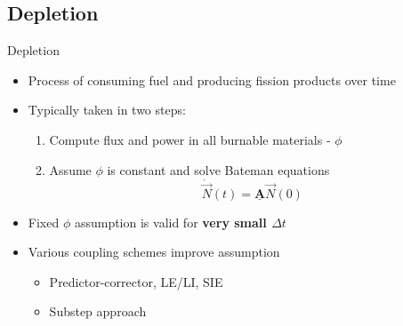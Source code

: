 \documentclass{beamer}
\begin{document}
\subsection{Depletion}
\begin{frame}{Depletion}
    \begin{itemize}
        \item Process of consuming fuel and producing fission products over time
        \item Typically taken in two steps:
            \begin{enumerate}
                \item Compute flux and power in all burnable materials - $\phi$
                \item Assume $\phi$ is constant and solve Bateman equations
                \begin{equation}
                    \dot{\vec{N}}(t)=\underline{\mathbf{A}}\vec{N}(0)
                \end{equation}
            \end{enumerate}
        \item Fixed $\phi$ assumption is valid for \textbf{very small $\Delta t$}
        \item Various coupling schemes improve assumption
            \begin{itemize}
                \item Predictor-corrector, LE/LI, SIE
                \item Substep approach
            \end{itemize}
    \end{itemize}
\end{frame}
\end{document}

